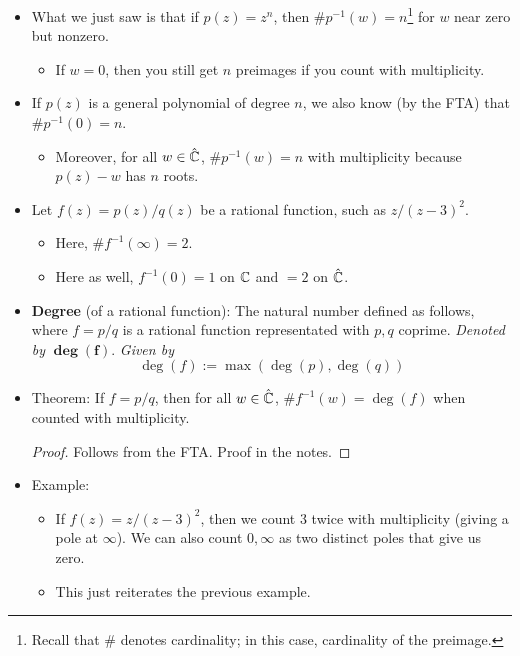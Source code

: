 \documentclass[../notes.tex]{subfiles}
\begin{document}
\begin{itemize}
\begin{itemize}
    \end{itemize}
    \item What we just saw is that if $p(z)=z^n$, then $\# p^{-1}(w)=n$\footnote{Recall that $\#$ denotes cardinality; in this case, cardinality of the preimage.} for $w$ near zero but nonzero.
    \begin{itemize}
        \item If $w=0$, then you still get $n$ preimages if you count with multiplicity.
    \end{itemize}
    \item If $p(z)$ is a general polynomial of degree $n$, we also know (by the FTA) that $\# p^{-1}(0)=n$.
    \begin{itemize}
        \item Moreover, for all $w\in\hat{\mathbb{C}}$, $\# p^{-1}(w)=n$ with multiplicity because $p(z)-w$ has $n$ roots.
    \end{itemize}
    \item Let $f(z)=p(z)/q(z)$ be a rational function, such as $z/(z-3)^2$.
    \begin{itemize}
        \item Here, $\# f^{-1}(\infty)=2$.
        \item Here as well, $f^{-1}(0)=1$ on $\mathbb{C}$ and $=2$ on $\hat{\mathbb{C}}$.
    \end{itemize}
    \item \textbf{Degree} (of a rational function): The natural number defined as follows, where $f=p/q$ is a rational function representated with $p,q$ coprime. \emph{Denoted by} $\bm{\deg(f)}$. \emph{Given by}
    \begin{equation*}
        \deg(f) := \max(\deg(p),\deg(q))
    \end{equation*}
    \item Theorem: If $f=p/q$, then for all $w\in\hat{\mathbb{C}}$, $\# f^{-1}(w)=\deg(f)$ when counted with multiplicity.
    \begin{proof}
        Follows from the FTA. Proof in the notes.
    \end{proof}
    \item Example:
    \begin{itemize}
        \item If $f(z)=z/(z-3)^2$, then we count 3 twice with multiplicity (giving a pole at $\infty$). We can also count $0,\infty$ as two distinct poles that give us zero.
        \item This just reiterates the previous example.
    \end{itemize}

\end{itemize}
\end{document}

